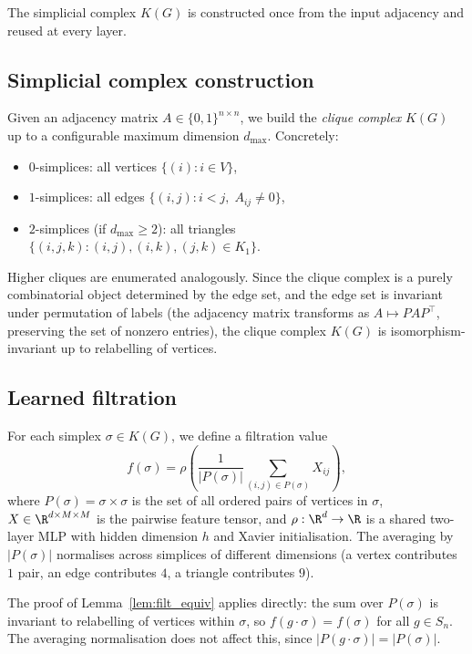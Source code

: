 The simplicial complex $K(G)$ is constructed once from the input adjacency and reused at every layer.


\subsection{Simplicial complex construction}

Given an adjacency matrix $A \in \{0,1\}^{n \times n}$, we build the \emph{clique complex} $K(G)$ up to a configurable maximum dimension $d_{\max}$. Concretely:
\begin{itemize}
    \item $0$-simplices: all vertices $\{(i) : i \in V\}$,
    \item $1$-simplices: all edges $\{(i,j) : i < j,\; A_{ij} \neq 0\}$,
    \item $2$-simplices (if $d_{\max} \geq 2$): all triangles $\{(i,j,k) : (i,j),(i,k),(j,k) \in K_1\}$.
\end{itemize}
Higher cliques are enumerated analogously. Since the clique complex is a purely combinatorial object determined by the edge set, and the edge set is invariant under permutation of labels (the adjacency matrix transforms as $A \mapsto P A P^\top$, preserving the set of nonzero entries), the clique complex $K(G)$ is isomorphism-invariant up to relabelling of vertices.


\subsection{Learned filtration}

For each simplex $\sigma \in K(G)$, we define a filtration value
\[
    f(\sigma) = \rho\!\left( \frac{1}{|P(\sigma)|} \sum_{(i,j) \in P(\sigma)} X_{ij} \right),
\]
where $P(\sigma) = \sigma \times \sigma$ is the set of all ordered pairs of vertices in $\sigma$, $X \in \R^{d \times M \times M}$ is the pairwise feature tensor, and $\rho: \R^d \to \R$ is a shared two-layer MLP with hidden dimension $h$ and Xavier initialisation. The averaging by $|P(\sigma)|$ normalises across simplices of different dimensions (a vertex contributes $1$ pair, an edge contributes $4$, a triangle contributes $9$).

\begin{remark}
The proof of Lemma~\ref{lem:filt_equiv} applies directly: the sum over $P(\sigma)$ is invariant to relabelling of vertices within $\sigma$, so $f(g \cdot \sigma) = f(\sigma)$ for all $g \in S_n$. The averaging normalisation does not affect this, since $|P(g \cdot \sigma)| = |P(\sigma)|$.
\end{remark}

